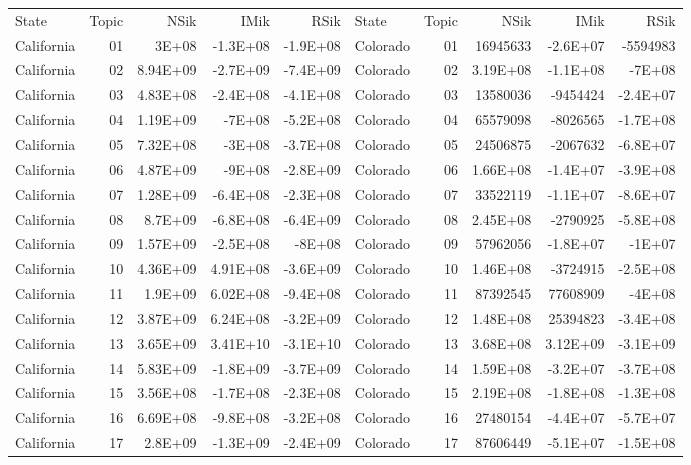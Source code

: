 \begin{table}[]
	\footnotesize
	\begin{tabular}{lrrrrlrrrr}
		State & Topic & NSik & IMik & RSik & State & Topic & NSik & IMik & RSik \\
		California &  01  & 3E+08 & -1.3E+08 & -1.9E+08 & Colorado &  01  & 16945633 & -2.6E+07 & -5594983 \\
		California &  02  & 8.94E+09 & -2.7E+09 & -7.4E+09 & Colorado &  02  & 3.19E+08 & -1.1E+08 & -7E+08 \\
		California &  03  & 4.83E+08 & -2.4E+08 & -4.1E+08 & Colorado &  03  & 13580036 & -9454424 & -2.4E+07 \\
		California &  04  & 1.19E+09 & -7E+08 & -5.2E+08 & Colorado &  04  & 65579098 & -8026565 & -1.7E+08 \\
		California &  05  & 7.32E+08 & -3E+08 & -3.7E+08 & Colorado &  05  & 24506875 & -2067632 & -6.8E+07 \\
		California &  06  & 4.87E+09 & -9E+08 & -2.8E+09 & Colorado &  06  & 1.66E+08 & -1.4E+07 & -3.9E+08 \\
		California &  07  & 1.28E+09 & -6.4E+08 & -2.3E+08 & Colorado &  07  & 33522119 & -1.1E+07 & -8.6E+07 \\
		California &  08  & 8.7E+09 & -6.8E+08 & -6.4E+09 & Colorado &  08  & 2.45E+08 & -2790925 & -5.8E+08 \\
		California &  09  & 1.57E+09 & -2.5E+08 & -8E+08 & Colorado &  09  & 57962056 & -1.8E+07 & -1E+07 \\
		California &  10 & 4.36E+09 & 4.91E+08 & -3.6E+09 & Colorado &  10 & 1.46E+08 & -3724915 & -2.5E+08 \\
		California &  11 & 1.9E+09 & 6.02E+08 & -9.4E+08 & Colorado &  11 & 87392545 & 77608909 & -4E+08 \\
		California &  12 & 3.87E+09 & 6.24E+08 & -3.2E+09 & Colorado &  12 & 1.48E+08 & 25394823 & -3.4E+08 \\
		California &  13 & 3.65E+09 & 3.41E+10 & -3.1E+10 & Colorado &  13 & 3.68E+08 & 3.12E+09 & -3.1E+09 \\
		California &  14 & 5.83E+09 & -1.8E+09 & -3.7E+09 & Colorado &  14 & 1.59E+08 & -3.2E+07 & -3.7E+08 \\
		California &  15 & 3.56E+08 & -1.7E+08 & -2.3E+08 & Colorado &  15 & 2.19E+08 & -1.8E+08 & -1.3E+08 \\
		California &  16 & 6.69E+08 & -9.8E+08 & -3.2E+08 & Colorado &  16 & 27480154 & -4.4E+07 & -5.7E+07 \\
		California &  17 & 2.8E+09 & -1.3E+09 & -2.4E+09 & Colorado &  17 & 87606449 & -5.1E+07 & -1.5E+08 \\

\end{tabular}
\end{table}
